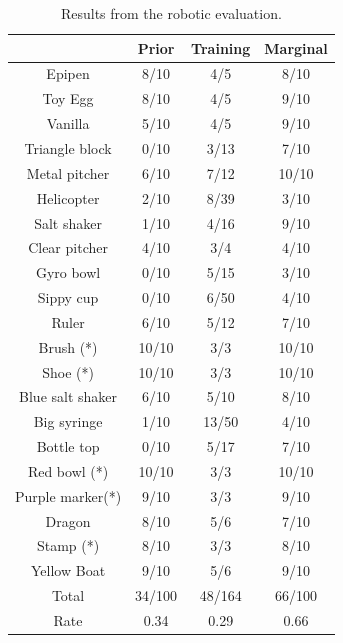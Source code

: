 \documentclass{article}
\begin{document}
\begin{table}
\begin{tabular}{cccc}
\toprule
                & Prior         &  Training     & Marginal\\
\midrule
Epipen          & 8/10          &  4/5         &  8/10 \\
Toy Egg         & 8/10          &  4/5         &  9/10 \\
Vanilla         & 5/10          &  4/5         &  9/10 \\
Triangle block  & 0/10          &  3/13        &  7/10 \\
Metal pitcher   & 6/10          &  7/12        &  10/10\\
Helicopter      & 2/10          &  8/39        &  3/10 \\
Salt shaker     & 1/10          &  4/16        &  9/10 \\
Clear pitcher   & 4/10          &  3/4         &  4/10 \\
Gyro bowl       & 0/10          &  5/15        &  3/10 \\
Sippy cup       & 0/10          &  6/50        &  4/10 \\
Ruler           & 6/10          &  5/12        &  7/10 \\
Brush (*)       & 10/10         &  3/3         & 10/10 \\
Shoe (*)        & 10/10         &  3/3         & 10/10 \\
Blue salt shaker&  6/10         &  5/10        &  8/10 \\
Big syringe     & 1/10          &  13/50       &  4/10 \\
Bottle top      & 0/10          &  5/17        &  7/10 \\
Red bowl (*)    & 10/10         &  3/3         & 10/10 \\
Purple marker(*)& 9/10          &  3/3         &  9/10 \\
Dragon          & 8/10          &  5/6         &  7/10 \\
Stamp (*)       & 8/10          &  3/3         &  8/10 \\
Yellow Boat     & 9/10          &  5/6         &  9/10 \\
\midrule
Total           & 34/100         & 48/164       & 66/100\\
Rate            & 0.34          &  0.29         & 0.66\\
\bottomrule
\end{tabular}
\caption{Results from the robotic evaluation.\label{table:robot_results}}
\end{table}
\end{document}
